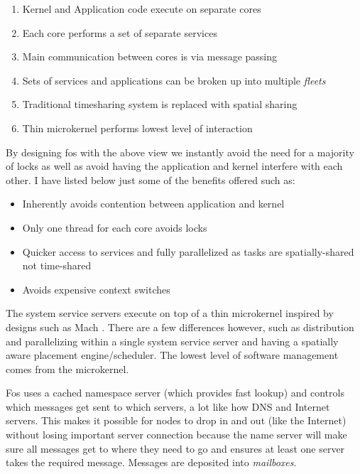 \documentclass[journal]{IEEEtran}
\begin{document}
\begin{enumerate}
\item Kernel and Application code execute on separate cores
\item Each core performs a set of separate services
\item Main communication between cores is via message passing
\item Sets of services and applications can be broken up into multiple \emph{fleets}
\item Traditional timesharing system is replaced with spatial sharing
\item Thin microkernel performs lowest level of interaction
\end{enumerate}

\vspace{5 mm}

By designing fos with the above view we instantly avoid the need for a majority of locks as well as avoid having the application and kernel interfere with each other. I have listed below just some of the benefits offered such as:

\vspace{2 mm}

\begin{itemize}
\item Inherently avoids contention between application and kernel
\item Only one thread for each core avoids locks
\item Quicker access to services and fully parallelized as tasks are spatially-shared not time-shared
\item Avoids expensive context switches
\end{itemize}

\vspace{5 mm}

The system service servers execute on top of a thin microkernel inspired by designs such as Mach \cite{Mach}. There are a few differences however, such as distribution and parallelizing within a single system service server and having a spatially aware placement engine/scheduler. The lowest level of software management comes from the microkernel.

Fos uses a cached namespace server (which provides fast lookup) and controls which messages get sent to which servers, a lot like how DNS and Internet servers. This makes it possible for nodes to drop in and out (like the Internet) without losing important server connection because the name server will make sure all messages get to where they need to go and ensures at least one server takes the required message. Messages are deposited into \emph{mailboxes}.
\end{document}

